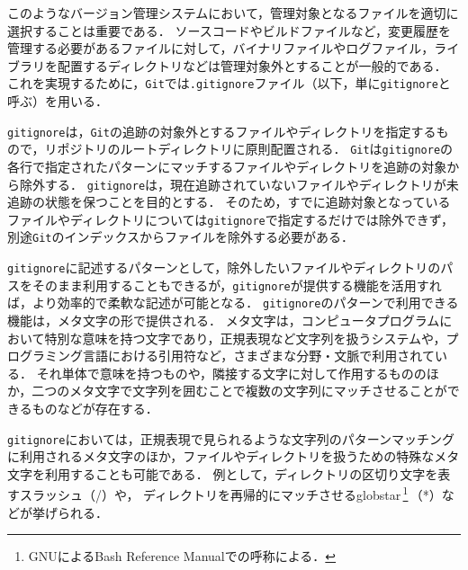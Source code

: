\documentclass[a4paper,xelatex,ja=standard,fontsize=11pt]{bxjsreport}
\newcommand{\myfootnote}[1]{\,\footnote{#1}\,}
\newcommand{\git}{\texttt{Git}}
\newcommand{\gitignore}{\texttt{gitignore}}
\newcommand{\pattern}[1]{{\codefont #1}}
\begin{document}
このようなバージョン管理システムにおいて，管理対象となるファイルを適切に選択することは重要である．
ソースコードやビルドファイルなど，変更履歴を管理する必要があるファイルに対して，バイナリファイルやログファイル，ライブラリを配置するディレクトリなどは管理対象外とすることが一般的である．
これを実現するために，\git{}では\;\texttt{.gitignore}ファイル（以下，単に\gitignore{}と呼ぶ）を用いる．

\gitignore{}は，\git{}の追跡の対象外とするファイルやディレクトリを指定するもので，リポジトリのルートディレクトリに原則配置される．
\git{}は\gitignore{}の各行で指定されたパターンにマッチするファイルやディレクトリを追跡の対象から除外する．
\gitignore{}は，現在追跡されていないファイルやディレクトリが未追跡の状態を保つことを目的とする\cite{git-doc}．
そのため，すでに追跡対象となっているファイルやディレクトリについては\gitignore{}で指定するだけでは除外できず，別途\git{}のインデックスからファイルを除外する必要がある．

\gitignore{}に記述するパターンとして，除外したいファイルやディレクトリのパスをそのまま利用することもできるが，\gitignore{}が提供する機能を活用すれば，より効率的で柔軟な記述が可能となる．
\gitignore{}のパターンで利用できる機能は，メタ文字の形で提供される．
メタ文字は，コンピュータプログラムにおいて特別な意味を持つ文字であり，正規表現など文字列を扱うシステムや，プログラミング言語における引用符など，さまざまな分野・文脈で利用されている．
それ単体で意味を持つものや，隣接する文字に対して作用するもののほか，二つのメタ文字で文字列を囲むことで複数の文字列にマッチさせることができるものなどが存在する．

\gitignore{}においては，正規表現で見られるような文字列のパターンマッチングに利用されるメタ文字のほか，ファイルやディレクトリを扱うための特殊なメタ文字を利用することも可能である．
例として，ディレクトリの区切り文字を表すスラッシュ（\pattern{/}）や，
ディレクトリを再帰的にマッチさせるglobstar\myfootnote{GNUによるBash Reference Manual\;\cite{bash-reference}での呼称による．}（\pattern{**}）などが挙げられる．
\end{document}
